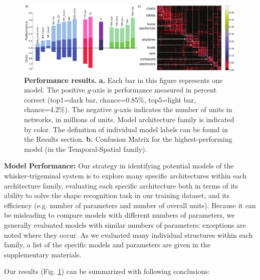 \begin{figure}
\includegraphics [width=1\linewidth]{figures/results.pdf}
\vspace{-2mm}
\caption{\textbf{Performance results.} \textbf{a.} Each bar in this figure represents one model. The positive $y$-axis is performance measured in percent correct (top1=dark bar, chance=0.85\%, top5=light bar, chance=4.2\%).   The negative $y$-axis indicates the number of units in networks, in millions of units.  Model architecture family is indicated by color.  The definition of individual model labels can be found in the Results section. \textbf{b.} Confusion Matrix for the highest-performing model (in the Temporal-Spatial family).~\label{fig_main}}
\end{figure}

\textbf{Model Performance:} 
Our strategy in identifying potential models of the whisker-trigeminal system is to explore many specific architectures within each architecture family, evaluating each specific architecture both in terms of its ability to solve the shape recognition task in our training dataset, and its efficiency (e.g. number of parameters and number of overall units).
Because it can be misleading to compare models with different numbers of parameters, we generally evaluated models with similar numbers of parameters: exceptions are noted where they occur.
As we evaluated many individual structures within each family, a list of the specific models and parameters are given in the supplementary materials.

Our results (Fig. \ref{fig_main}) can be summarized with following conclusions:

